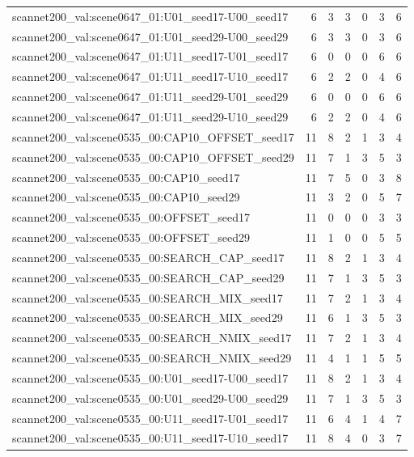 \begin{table}[t]
\begin{tabular}{lrrrrrr}
scannet200\_val:scene0647\_01:U01\_seed17-U00\_seed17 & 6 & 3 & 3 & 0 & 3 & 6 \\
scannet200\_val:scene0647\_01:U01\_seed29-U00\_seed29 & 6 & 3 & 3 & 0 & 3 & 6 \\
scannet200\_val:scene0647\_01:U11\_seed17-U01\_seed17 & 6 & 0 & 0 & 0 & 6 & 6 \\
scannet200\_val:scene0647\_01:U11\_seed17-U10\_seed17 & 6 & 2 & 2 & 0 & 4 & 6 \\
scannet200\_val:scene0647\_01:U11\_seed29-U01\_seed29 & 6 & 0 & 0 & 0 & 6 & 6 \\
scannet200\_val:scene0647\_01:U11\_seed29-U10\_seed29 & 6 & 2 & 2 & 0 & 4 & 6 \\
scannet200\_val:scene0535\_00:CAP10\_OFFSET\_seed17 & 11 & 8 & 2 & 1 & 3 & 4 \\
scannet200\_val:scene0535\_00:CAP10\_OFFSET\_seed29 & 11 & 7 & 1 & 3 & 5 & 3 \\
scannet200\_val:scene0535\_00:CAP10\_seed17 & 11 & 7 & 5 & 0 & 3 & 8 \\
scannet200\_val:scene0535\_00:CAP10\_seed29 & 11 & 3 & 2 & 0 & 5 & 7 \\
scannet200\_val:scene0535\_00:OFFSET\_seed17 & 11 & 0 & 0 & 0 & 3 & 3 \\
scannet200\_val:scene0535\_00:OFFSET\_seed29 & 11 & 1 & 0 & 0 & 5 & 5 \\
scannet200\_val:scene0535\_00:SEARCH\_CAP\_seed17 & 11 & 8 & 2 & 1 & 3 & 4 \\
scannet200\_val:scene0535\_00:SEARCH\_CAP\_seed29 & 11 & 7 & 1 & 3 & 5 & 3 \\
scannet200\_val:scene0535\_00:SEARCH\_MIX\_seed17 & 11 & 7 & 2 & 1 & 3 & 4 \\
scannet200\_val:scene0535\_00:SEARCH\_MIX\_seed29 & 11 & 6 & 1 & 3 & 5 & 3 \\
scannet200\_val:scene0535\_00:SEARCH\_NMIX\_seed17 & 11 & 7 & 2 & 1 & 3 & 4 \\
scannet200\_val:scene0535\_00:SEARCH\_NMIX\_seed29 & 11 & 4 & 1 & 1 & 5 & 5 \\
scannet200\_val:scene0535\_00:U01\_seed17-U00\_seed17 & 11 & 8 & 2 & 1 & 3 & 4 \\
scannet200\_val:scene0535\_00:U01\_seed29-U00\_seed29 & 11 & 7 & 1 & 3 & 5 & 3 \\
scannet200\_val:scene0535\_00:U11\_seed17-U01\_seed17 & 11 & 6 & 4 & 1 & 4 & 7 \\
scannet200\_val:scene0535\_00:U11\_seed17-U10\_seed17 & 11 & 8 & 4 & 0 & 3 & 7 \\

\end{tabular}
\end{table}
